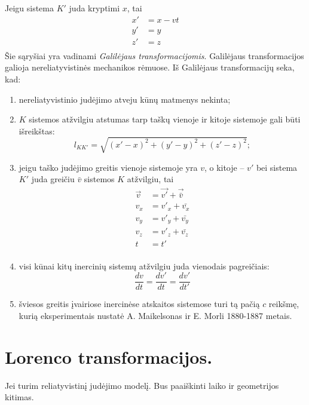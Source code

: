 Jeigu sistema $K'$ juda kryptimi $x$, tai
\begin{align*}
  x' &= x - vt \\
  y' &= y \\
  z' &= z \\
\end{align*}
Šie sąryšiai yra vadinami \emph{Galilėjaus transformacijomis}.
Galilėjaus transformacijos galioja nereliatyvistinės mechanikos rėmuose.
Iš Galilėjaus transformacijų seka, kad:
\begin{enumerate}
  \item nereliatyvistinio judėjimo atveju kūnų matmenys nekinta;
  \item $K$ sistemos atžvilgiu atstumas tarp taškų vienoje ir kitoje
    sistemoje gali būti išreikštas:
    \begin{equation*}
      l_{KK'} = \sqrt{(x'-x)^{2} + (y'-y)^{2} + (z'-z)^{2}};
    \end{equation*}
  \item jeigu taško judėjimo greitis vienoje sistemoje yra $v$, o
    kitoje – $v'$ bei sistema $K'$ juda greičiu $\bar{v}$ sistemos
    $K$ atžvilgiu, tai
    \begin{align*}
      \vec{v} &= \vec{v'} + \vec{\bar{v}} \\
      v_{x} &= v'_{x} + \bar{v_{x}} \\
      v_{y} &= v'_{y} + \bar{v_{y}} \\
      v_{z} &= v'_{z} + \bar{v_{z}} \\
      t &= t' \\
    \end{align*}
  \item visi kūnai kitų inercinių sistemų atžvilgiu juda vienodais
    pagreičiais:
    \begin{equation*}
      \frac{dv}{dt} = \frac{dv'}{dt} = \frac{dv'}{dt'}
    \end{equation*}
  \item šviesos greitis įvairiose inercinėse atskaitos sistemose turi tą
    pačią $c$ reikšmę, kurią eksperimentais nustatė A. Maikelsonas ir
    E. Morli 1880-1887 metais.
\end{enumerate}

\section{Lorenco transformacijos.}

Jei turim reliatyvistinį judėjimo modelį. Bus paaiškinti laiko ir
geometrijos kitimas.

